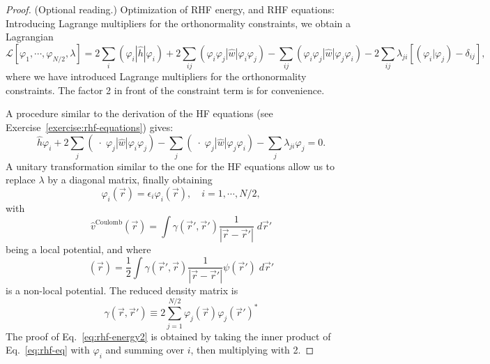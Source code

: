 \documentclass{report}
\theoremstyle{plain}
\theoremstyle{definition}
\begin{document}
\begin{proof}(Optional reading.)
Optimization of RHF energy, and RHF equations: Introducing Lagrange
multipliers for the orthonormality constraints, we obtain a Lagrangian
\begin{equation}
  \mathcal{L}[\varphi_1,\cdots,\varphi_{N/2},\lambda] = 2 \sum_i
  (\varphi_i|\hat{h}|\varphi_i) + 2 \sum_{ij}
  (\varphi_i\varphi_j|\hat{w}|\varphi_i\varphi_j) - \sum_{ij}
  (\varphi_i\varphi_j|\hat{w}|\varphi_j\varphi_i) - 2 \sum_{ij}
  \lambda_{ji}[(\varphi_i|\varphi_j) - \delta_{ij}],
\end{equation}
where we have introduced Lagrange multipliers for the orthonormality
constraints. The factor 2 in front of the constraint term is for
convenience. 

A procedure similar to the derivation of the HF equations (see
Exercise~\ref{exercise:rhf-equations}) gives:
\begin{equation}
  \hat{h}\varphi_i + 2\sum_j
  (\;\cdot\;\varphi_j|\hat{w}|\varphi_i\varphi_j) -  \sum_j
  (\;\cdot\;\varphi_j|\hat{w}|\varphi_j\varphi_i ) -  \sum_j
  \lambda_{ji} \varphi_j = 0.
\end{equation}
A unitary transformation similar to the one for the HF equations allow
us to replace $\lambda$ by a diagonal matrix, finally obtaining
\begin{equation}
  [\hat{h} + \hat{v}^\text{Coulomb} - \hat{v}^\text{exchange}]
  \varphi_i(\vec{r}) = \epsilon_i \varphi_i(\vec{r}), \quad i=1,\cdots,N/2,
\end{equation}
with
\begin{equation}
  \hat{v}^\text{Coulomb}(\vec{r}) = \int
  \gamma(\vec{r}',\vec{r}')\frac{1}{|\vec{r}-\vec{r}'|} \; d\vec{r}'
\end{equation}
being a local potential, and where
\begin{equation}
  [\hat{v}^\text{exchange}\psi](\vec{r}) = \frac{1}{2}\int
  \gamma(\vec{r}',\vec{r})\frac{1}{|\vec{r}-\vec{r}'|}
  \psi(\vec{r}')\; d\vec{r}'
\end{equation}
is a non-local potential. The reduced density matrix is
\begin{equation}
  \gamma(\vec{r},\vec{r}') \equiv 2 \sum_{j=1}^{N/2}
  \varphi_j(\vec{r})\varphi_j(\vec{r}')^*
\end{equation}
The proof of Eq.~\eqref{eq:rhf-energy2} is obtained by taking the
inner product of Eq.~\eqref{eq:rhf-eq} with $\varphi_i$ and summing
over $i$, then multiplying with 2.
\end{proof}
\end{document}
